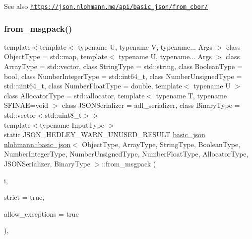 \begin{DoxySeeAlso}{See also}
\href{https://json.nlohmann.me/api/basic_json/from_cbor/}{\tt https\+://json.\+nlohmann.\+me/api/basic\+\_\+json/from\+\_\+cbor/} 
\end{DoxySeeAlso}
\mbox{\label{classnlohmann_1_1basic__json_adbcab52fca1e25b3311ef14e71a57590}} 
\subsubsection{\texorpdfstring{from\+\_\+msgpack()}{from\_msgpack()}\hspace{0.1cm}{\footnotesize\ttfamily [1/2]}}
{\footnotesize\ttfamily template$<$template$<$ typename U, typename V, typename... Args $>$ class Object\+Type = std\+::map, template$<$ typename U, typename... Args $>$ class Array\+Type = std\+::vector, class String\+Type  = std\+::string, class Boolean\+Type  = bool, class Number\+Integer\+Type  = std\+::int64\+\_\+t, class Number\+Unsigned\+Type  = std\+::uint64\+\_\+t, class Number\+Float\+Type  = double, template$<$ typename U $>$ class Allocator\+Type = std\+::allocator, template$<$ typename T, typename S\+F\+I\+N\+A\+E=void $>$ class J\+S\+O\+N\+Serializer = adl\+\_\+serializer, class Binary\+Type  = std\+::vector$<$std\+::uint8\+\_\+t$>$$>$ \\
template$<$typename Input\+Type $>$ \\
static J\+S\+O\+N\+\_\+\+H\+E\+D\+L\+E\+Y\+\_\+\+W\+A\+R\+N\+\_\+\+U\+N\+U\+S\+E\+D\+\_\+\+R\+E\+S\+U\+LT \hyperlink{classnlohmann_1_1basic__json}{basic\+\_\+json} \hyperlink{classnlohmann_1_1basic__json}{nlohmann\+::basic\+\_\+json}$<$ Object\+Type, Array\+Type, String\+Type, Boolean\+Type, Number\+Integer\+Type, Number\+Unsigned\+Type, Number\+Float\+Type, Allocator\+Type, J\+S\+O\+N\+Serializer, Binary\+Type $>$\+::from\+\_\+msgpack (\begin{DoxyParamCaption}\item[{Input\+Type \&\&}]{i,  }\item[{const bool}]{strict = {\ttfamily true},  }\item[{const bool}]{allow\+\_\+exceptions = {\ttfamily true} }\end{DoxyParamCaption})\hspace{0.3cm}{\ttfamily [inline]}, {\ttfamily [static]}}



